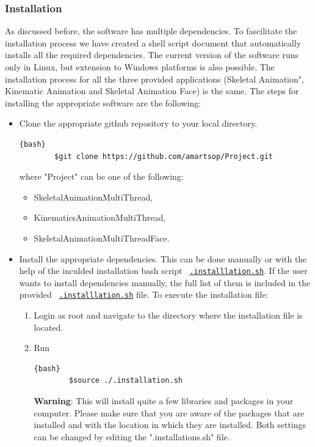 \subsubsection{Installation}
\label{installation}
As discussed before, the software has multiple dependencies. To fascilitate 
the installation process we have created a shell script document that 
automatically installs all the required dependencies. The current version of 
the software runs only in Linux, but extension to Windows platforms is also 
possible. The installation process for all the three provided applications
(Skeletal Animation", Kinematic Animation and Skeletal Animation Face)
is the same. The steps for installing the appropriate software
are the following:

\begin{itemize}
    \item Clone the appropriate github repository to your local directory.
    \begin{lstlisting}{bash}
        $git clone https://github.com/amartsop/Project.git 
    \end{lstlisting}
    \noindent where "Project" can be one of the following:
    \begin{itemize}
        \item SkeletalAnimationMultiThread,
        \item KinematicsAnimationMultiThread,
        \item SkeletalAnimationMultiThreadFace.
    \end{itemize}
    
    \item Install the appropriate dependencies. This can be done manually 
    or with the help of the inculded installation bash script 
    \texttt{ \href{https://github.com/amartsop/SkeletalAnimationMultiThreadFace/blob/master/.installation.sh}{.installlation.sh}}.
    If the user wants to install dependencies manually, the full list 
    of them is included in the provided \texttt{ \href{https://github.com/amartsop/SkeletalAnimationMultiThreadFace/blob/master/.installation.sh}{.installlation.sh}}
    file. To execute the installation file:
    \begin{enumerate}
        \item Login as root and navigate to the directory where the installation 
        file is located.
        \item Run 
    \begin{lstlisting}{bash}
        $source ./.installation.sh
    \end{lstlisting}
    \noindent \textbf{Warning}: This will install quite a few libraries and 
    packages in your computer. Please make sure that you are aware of the 
    packages that are installed and with the location in which they are installed.
    Both settings can be changed by editing the ".installations.sh" file.
    \end{enumerate}


\end{itemize}

